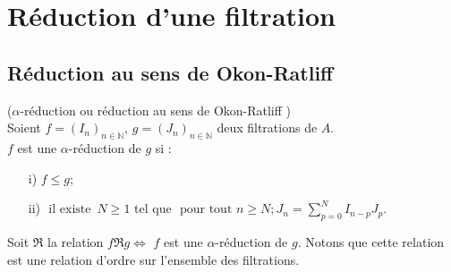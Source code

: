 \section{Réduction d'une filtration}
\subsection{Réduction au sens de Okon-Ratliff}
\begin{madefinition}
	($\alpha$-réduction ou réduction au sens de Okon-Ratliff\cite{Ok} )\\
	Soient $f=(I_n)_{n \in \mathbb{N}}$, $g=(J_n)_{n \in \mathbb{N}}$ deux filtrations de $A$.\\
	$f$ est une $\alpha$-réduction de $g$ si : \\
	\begin{enumerate}
		\item[i)] $f \leq g$;
		\item[ii)] $\text{ il existe } \, N \geq 1$ tel que $\text{ pour tout } n \geq N ; J_n = \displaystyle \sum_{p=0}^{N}{I_{n-p} J_p}$.
	\end{enumerate}
\end{madefinition}
\begin{maremarque}
	Soit $\Re$ la relation $f \Re g \Leftrightarrow$ $f$ est une $\alpha$-réduction de $g$. Notons que cette relation est une relation d'ordre sur l'ensemble des filtrations.	
\end{maremarque}
